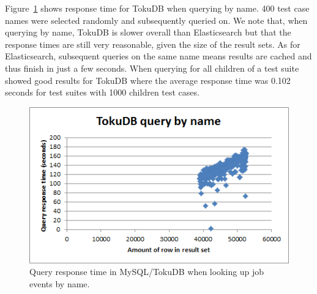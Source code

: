Figure~\ref{fig:toku_by_name} shows response time for TokuDB when querying by name. 400 test case names were selected randomly and subsequently queried on. We note that, when querying by name, TokuDB is slower overall than Elasticsearch but that the response times are still very reasonable, given the size of the result sets. As for Elasticsearch, subsequent queries on the same name means results are cached and thus finish in just a few seconds. 
When querying for all children of a test suite showed good results for TokuDB where the average response time was 0.102 seconds for test suites with 1000 children test cases.

\begin{figure}[h!]
\centering
\includegraphics[]{figure/toku_by_name.png}
\caption{Query response time in MySQL/TokuDB when looking up job events by name.}
\label{fig:toku_by_name}
\end{figure}
%

